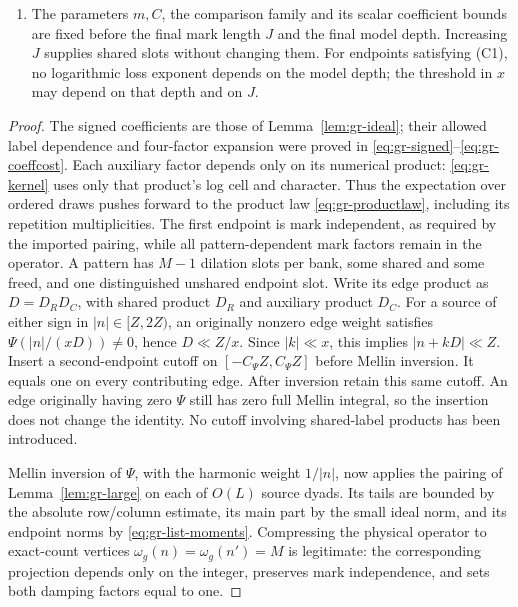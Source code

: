 \begin{proposition}
\begin{enumerate}
\(b_\nu\) only on \(D_2\), and \(u_\nu,v_\nu\) only on
the ordered unshared big-bank labels at their respective endpoints.
Each of these four factors has modulus at most one. In particular,
both list coefficients ignore every small-bank label.
\item The parameters \(m,C\), the comparison family and its scalar
coefficient bounds are fixed before the final mark length \(J\)
and the final model depth. Increasing \(J\) supplies shared slots
without changing them. For endpoints satisfying \textup{(C1)},
no logarithmic loss exponent depends on the model depth; the
threshold in \(x\) may depend on that depth and on \(J\).
\end{enumerate}
\end{proposition}

\begin{proof}
The signed coefficients are those of Lemma~\ref{lem:gr-ideal};
their allowed label dependence and four-factor expansion were proved
in \eqref{eq:gr-signed}--\eqref{eq:gr-coeffcost}.
Each auxiliary factor depends only on its numerical product:
\eqref{eq:gr-kernel} uses only that product's log cell and character.
Thus the expectation over ordered draws pushes forward to the product
law \eqref{eq:gr-productlaw}, including its repetition multiplicities.
The first endpoint
is mark independent, as required by the imported pairing, while
all pattern-dependent mark factors remain in the operator.
A pattern has \(M-1\) dilation slots per bank, some shared
and some freed, and one distinguished unshared endpoint slot.
Write its edge product as \(D=D_RD_C\), with shared product \(D_R\)
and auxiliary product \(D_C\).
For a source of either sign in \(|n|\in[Z,2Z)\), an originally nonzero edge
weight satisfies
\(\Psi(|n|/(xD))\ne0\), hence \(D\ll Z/x\).
Since \(|k|\ll x\), this implies \(|n+kD|\ll Z\).
Insert a second-endpoint cutoff on \([-C_\Psi Z,C_\Psi Z]\)
before Mellin inversion.  It equals one on every contributing edge.
After inversion retain this same cutoff.  An edge originally having
zero \(\Psi\) still has zero full Mellin integral, so the insertion
does not change the identity.  No cutoff involving shared-label
products has been introduced.

Mellin inversion of \(\Psi\), with the harmonic weight \(1/|n|\),
now applies the pairing of Lemma~\ref{lem:gr-large} on each of
\(O(L)\) source dyads.  Its tails are bounded by the absolute
row/column estimate, its main part by the small ideal norm, and
its endpoint norms by \eqref{eq:gr-list-moments}.
Compressing the physical operator to exact-count vertices
\(\omega_g(n)=\omega_g(n')=M\) is legitimate:
the corresponding projection depends only on the integer, preserves
mark independence, and sets both damping factors equal to one.


\end{proof}
